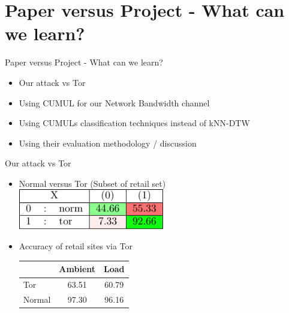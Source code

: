 \documentclass{beamer}
\begin{document}

\section[Project]{Paper versus Project - What can we learn?}
\begin{frame}{Paper versus Project - What can we learn?}
\begin{itemize}
\item Our attack vs Tor
\item Using CUMUL for our Network Bandwidth channel
\item Using CUMULs classification techniques instead of kNN-DTW
\item Using their evaluation methodology / discussion
\end{itemize}
\end{frame}


\begin{frame}{Our attack vs Tor}
\begin{itemize}
\item Normal versus Tor (Subset of retail set) \\
\includegraphics[width=0.5\textwidth]{TorRecall}

\item Accuracy of retail sites via Tor \\
\begin{tabular}{lcc} \hline
        & Ambient   & Load \\ \hline
Tor     & 63.51     & 60.79 \\
Normal  & 97.30     & 96.16 \\ \hline
\end{tabular}
\end{itemize}
\end{frame}
\end{document}
